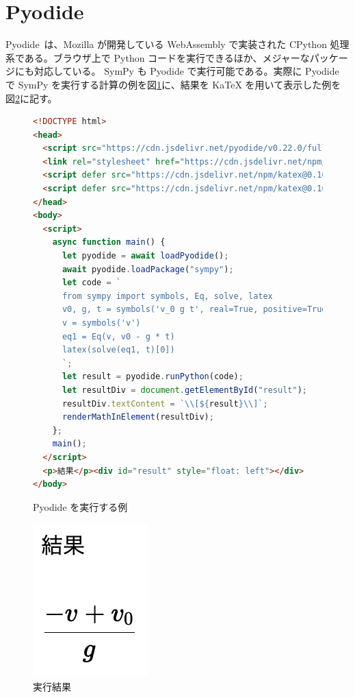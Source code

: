 \section{Pyodide}
Pyodide~\cite{Pyodide}は、Mozilla が開発している WebAssembly で実装された CPython 処理系である。ブラウザ上で Python コードを実行できるほか、メジャーなパッケージにも対応している。 SymPy も Pyodide で実行可能である。実際に Pyodide で SymPy を実行する計算の例を図\ref{Pyodide_example}に、結果を KaTeX を用いて表示した例を図\ref{Pyodide_result}に記す。

\begin{figure}[htb]
\begin{lstlisting}[language=html]
<!DOCTYPE html>
<head>
  <script src="https://cdn.jsdelivr.net/pyodide/v0.22.0/full/pyodide.js"></script>
  <link rel="stylesheet" href="https://cdn.jsdelivr.net/npm/katex@0.16.4/dist/katex.min.css" integrity="sha384-vKruj+a13U8yHIkAyGgK1J3ArTLzrFGBbBc0tDp4ad/EyewESeXE/Iv67Aj8gKZ0" crossorigin="anonymous">
  <script defer src="https://cdn.jsdelivr.net/npm/katex@0.16.4/dist/katex.min.js" integrity="sha384-PwRUT/YqbnEjkZO0zZxNqcxACrXe+j766U2amXcgMg5457rve2Y7I6ZJSm2A0mS4" crossorigin="anonymous"></script>
  <script defer src="https://cdn.jsdelivr.net/npm/katex@0.16.4/dist/contrib/auto-render.min.js" integrity="sha384-+VBxd3r6XgURycqtZ117nYw44OOcIax56Z4dCRWbxyPt0Koah1uHoK0o4+/RRE05" crossorigin="anonymous" onload="renderMathInElement(document.body);"></script>
</head>
<body>
  <script>
    async function main() {
      let pyodide = await loadPyodide();
      await pyodide.loadPackage("sympy");
      let code = `
      from sympy import symbols, Eq, solve, latex
      v0, g, t = symbols('v_0 g t', real=True, positive=True)
      v = symbols('v')
      eq1 = Eq(v, v0 - g * t)
      latex(solve(eq1, t)[0])
      `;
      let result = pyodide.runPython(code);
      let resultDiv = document.getElementById("result");
      resultDiv.textContent = `\\[${result}\\]`;
      renderMathInElement(resultDiv);
    };
    main();
  </script>
  <p>結果</p><div id="result" style="float: left"></div>
</body>
\end{lstlisting}
\caption{Pyodide を実行する例} \label{Pyodide_example}
\end{figure}
\restoregeometry

\begin{figure}[htb]
\centering
\includegraphics{work/pyodide_screenshot.png}
\caption{実行結果} \label{Pyodide_result}
\end{figure}

